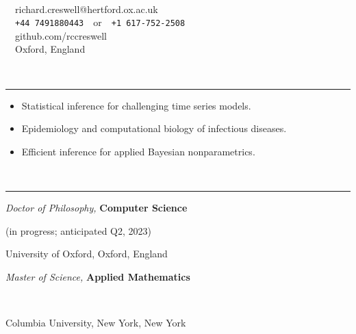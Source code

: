 \documentclass[11pt]{article}
\begin{document}
\noindent\parbox{.3\textwidth}{\LARGE \textbf{}}
\parbox{.3\textwidth}{~}
\parbox{.4\textwidth}{
\-\hspace{0cm}{\faEnvelopeO}~~richard.creswell@hertford.ox.ac.uk\\
\-\hspace{0cm}{\faWhatsapp}~~\texttt{\footnotesize +44 7491880443}~~or~~\texttt{\footnotesize +1 617-752-2508}\\
\-\hspace{0cm}{\faGithub}~~github.com/rccreswell\\
{ \faHome}~~Oxford, England
}

\vspace{0.6cm}

\vspace{-2.75mm} \\
\rule{\textwidth}{0.4pt}
\vspace{-7mm}
\begin{itemize}[leftmargin=*]
\setlength{\itemsep}{2pt}
\setlength{\parskip}{0pt}
\setlength{\parsep}{0pt}
\item Statistical inference for challenging time series models.
\item Epidemiology and computational biology of infectious diseases.
\item Efficient inference for applied Bayesian nonparametrics.
\end{itemize}

 

\vspace{0.4cm}

\vspace{-2.75mm} \\
\rule{\textwidth}{0.4pt}
\vspace{0.1mm}
\noindent\parbox{.65\textwidth}{\raggedright \textit{{D}octor of Philosophy,} \textbf{Computer Science}}
\parbox{.35\textwidth}{\raggedleft (in progress; anticipated Q2, 2023)}
University of Oxford, Oxford, England

\vspace{0.4cm}

\noindent\parbox{.75\textwidth}{\raggedright \textit{Master of Science,} \textbf{Applied Mathematics}}
\parbox{.25\textwidth}{\raggedleft  ~}
Columbia University, New York, New York


\vspace{0.4cm}
\end{document}
